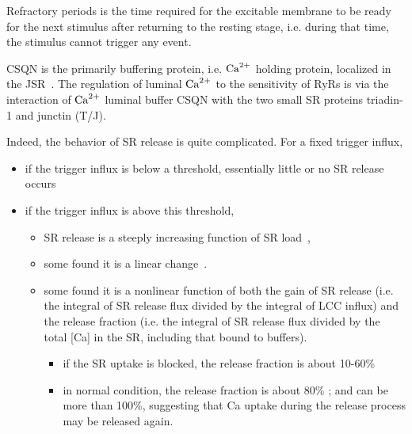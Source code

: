 \begin{framed}
  Refractory periods is the time required for the excitable membrane
  to be ready for the next stimulus after returning to the resting
  stage, i.e. during that time, the stimulus cannot trigger any event.
\end{framed}

\begin{framed}
  CSQN is the primarily buffering protein, i.e. ${\text{Ca}^{2+}}$ holding
  protein, localized in the JSR~\citep{franzini_armstrong1987sct}. The
  regulation of luminal ${\text{Ca}^{2+}}$ to the sensitivity of RyRs is via
  the interaction of ${\text{Ca}^{2+}}$ luminal buffer CSQN with the two small
  SR proteins triadin-1 and junctin (T/J).
\end{framed}

Indeed, the behavior of SR release is quite complicated. For a fixed
trigger influx, 
\begin{itemize}
\item if the trigger influx is below a threshold, essentially little
  or no SR release occurs~\citep{bassani1995fsr, shannon2000pfs}
\item if the trigger influx is above this threshold, 
  \begin{itemize}
  \item SR release is a steeply increasing function of SR
    load~\citep{bassani1995fsr, shannon2000pfs},
  \item some found it is a linear change~\citep{janczewski1995esr}.
  \item some found it is a nonlinear function of both the gain of SR
    release (i.e. the integral of SR release flux divided by the
    integral of LCC influx) and the release fraction (i.e. the
    integral of SR release flux divided by the total [Ca] in the SR,
    including that bound to buffers)\citep{shannon2000pfs}.
    \begin{itemize}
    \item if the SR uptake is blocked, the release fraction is about
      10-60\%~\citep{bassani1995fsr}
    \item in normal condition, the release fraction is about 80\%
      \citep{trafford1999nrr}; and can be more than 100\%, suggesting
      that Ca uptake during the release process may be released again.
    \end{itemize}
  \end{itemize}
\end{itemize} 

